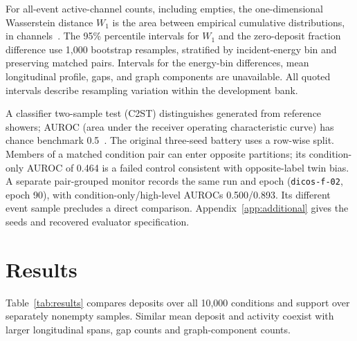 \documentclass[11pt]{article}
\begin{document}
For all-event active-channel counts, including empties, the one-dimensional Wasserstein distance $W_1$ is the area between empirical cumulative distributions, in channels~\cite{kansalmetrics}. The 95\% percentile intervals for $W_1$ and the zero-deposit fraction difference use 1,000 bootstrap resamples, stratified by incident-energy bin and preserving matched pairs. Intervals for the energy-bin differences, mean longitudinal profile, gaps, and graph components are unavailable. All quoted intervals describe resampling variation within the development bank.

A classifier two-sample test (C2ST) distinguishes generated from reference showers; AUROC (area under the receiver operating characteristic curve) has chance benchmark 0.5~\cite{c2st,kansalmetrics}. The original three-seed battery uses a row-wise split. Members of a matched condition pair can enter opposite partitions; its condition-only AUROC of 0.464 is a failed control consistent with opposite-label twin bias. A separate pair-grouped monitor records the same run and epoch (\texttt{dicos-f-02}, epoch 90), with condition-only/high-level AUROCs 0.500/0.893. Its different event sample precludes a direct comparison. Appendix~\ref{app:additional} gives the seeds and recovered evaluator specification.

\section{Results}
\label{sec:results}

Table~\ref{tab:results} compares deposits over all 10,000 conditions and support over separately nonempty samples. Similar mean deposit and activity coexist with larger longitudinal spans, gap counts and graph-component counts.
\end{document}
